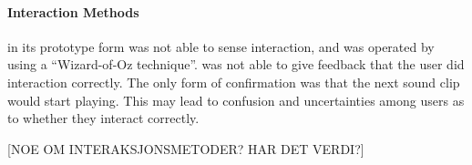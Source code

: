 \paragraph{Interaction Methods}
\buddy{} in its prototype form was not able to sense interaction, and was operated by using a ``Wizard-of-Oz technique''\cite{wilson1988rapid}. \buddy{} was not able to give feedback that the user did interaction correctly. The only form of confirmation was that the next sound clip would start playing. This may lead to confusion and uncertainties among users as to whether they interact correctly. \iref{}

[NOE OM INTERAKSJONSMETODER? HAR DET VERDI?]





